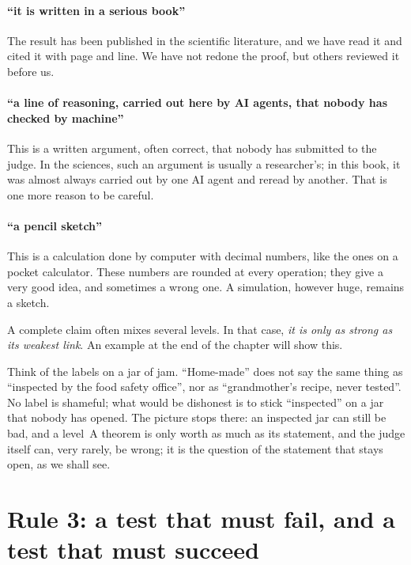 \paragraph{ ``it is written in a serious book''} The result has been published in the scientific
literature, and we have read it and cited it with page and line. We have not redone the proof, but others reviewed it
before us.

\paragraph{ ``a line of reasoning, carried out here by AI agents, that nobody has checked by machine''}
This is a written argument, often correct, that nobody has submitted to the judge. In the sciences, such an argument
is usually a researcher's; in this book, it was almost always carried out by one AI agent and reread by another. That
is one more reason to be careful.

\paragraph{ ``a pencil sketch''} This is a calculation done by computer with decimal numbers, like the ones
on a pocket calculator. These numbers are rounded at every operation; they give a very good idea, and sometimes a
wrong one. A simulation, however huge, remains a sketch.

\medskip
A complete claim often mixes several levels. In that case, \emph{it is only as strong as its weakest link}. An example
at the end of the chapter will show this.

\begin{analogie}
Think of the labels on a jar of jam. ``Home-made'' does not say the same thing as ``inspected by the food safety
office'', nor as ``grandmother's recipe, never tested''. No label is shameful; what would be dishonest is to stick
``inspected'' on a jar that nobody has opened. The picture stops there: an inspected jar can still be bad, and a
level~A theorem is only worth as much as its statement, and the judge itself can, very rarely, be wrong; it is the
question of the statement that stays open, as we shall see.
\end{analogie}

\section{Rule 3: a test that must fail, and a test that must succeed}

